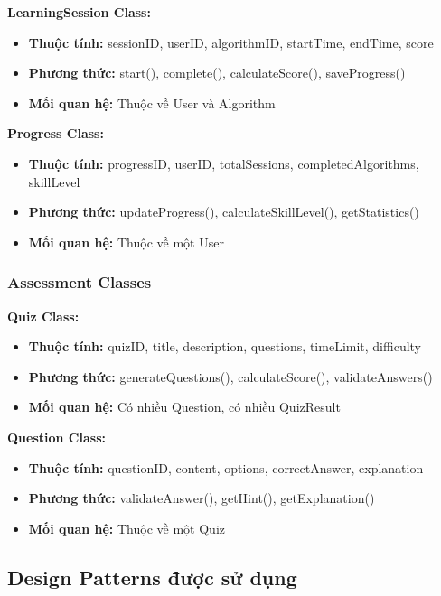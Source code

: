 \textbf{LearningSession Class:}
\begin{itemize}
    \item \textbf{Thuộc tính:} sessionID, userID, algorithmID, startTime, endTime, score
    \item \textbf{Phương thức:} start(), complete(), calculateScore(), saveProgress()
    \item \textbf{Mối quan hệ:} Thuộc về User và Algorithm
\end{itemize}

\textbf{Progress Class:}
\begin{itemize}
    \item \textbf{Thuộc tính:} progressID, userID, totalSessions, completedAlgorithms, skillLevel
    \item \textbf{Phương thức:} updateProgress(), calculateSkillLevel(), getStatistics()
    \item \textbf{Mối quan hệ:} Thuộc về một User
\end{itemize}

\subsubsection{Assessment Classes}

\textbf{Quiz Class:}
\begin{itemize}
    \item \textbf{Thuộc tính:} quizID, title, description, questions, timeLimit, difficulty
    \item \textbf{Phương thức:} generateQuestions(), calculateScore(), validateAnswers()
    \item \textbf{Mối quan hệ:} Có nhiều Question, có nhiều QuizResult
\end{itemize}

\textbf{Question Class:}
\begin{itemize}
    \item \textbf{Thuộc tính:} questionID, content, options, correctAnswer, explanation
    \item \textbf{Phương thức:} validateAnswer(), getHint(), getExplanation()
    \item \textbf{Mối quan hệ:} Thuộc về một Quiz
\end{itemize}

\subsection{Design Patterns được sử dụng}

